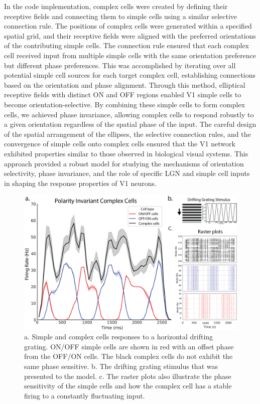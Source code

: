 \documentclass[12pt]{article}
\begin{document}
In the code implementation, complex cells were created by defining their receptive fields and connecting them to simple cells using a similar selective connection rule. The positions of complex cells were generated within a specified spatial grid, and their receptive fields were aligned with the preferred orientations of the contributing simple cells. The connection rule ensured that each complex cell received input from multiple simple cells with the same orientation preference but different phase preferences. This was accomplished by iterating over all potential simple cell sources for each target complex cell, establishing connections based on the orientation and phase alignment. Through this method, elliptical receptive fields with distinct ON and OFF regions enabled V1 simple cells to become orientation-selective. By combining these simple cells to form complex cells, we achieved phase invariance, allowing complex cells to respond robustly to a given orientation regardless of the spatial phase of the input. The careful design of the spatial arrangement of the ellipses, the selective connection rules, and the convergence of simple cells onto complex cells ensured that the V1 network exhibited properties similar to those observed in biological visual systems. This approach provided a robust model for studying the mechanisms of orientation selectivity, phase invariance, and the role of specific LGN and simple cell inputs in shaping the response properties of V1 neurons.


\begin{figure}[H]
    \centering
    \includegraphics[width=1 \textwidth]{figures/complex_invariance_figure.png}
    \caption{a. Simple and complex cells responses to a horizontal drifting grating. ON/OFF simple cells are shown in red with an offset phase from the OFF/ON cells. The black complex cells do not exhibit the same phase sensitive. b. The drifting grating stimulus that was presented to the model. c. The raster plots also illustrate the phase sensitivity of the simple cells and how the complex cell has a stable firing to a constantly fluctuating input.}
    \label{fig:polarity invariance}
\end{figure}
\end{document}
